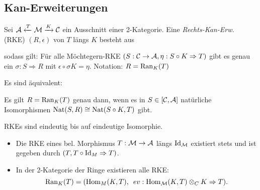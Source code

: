 \documentclass{cheat-sheet}
\begin{document}
\vfill
\columnbreak

\subsection{Kan-Erweiterungen}

\begin{defn}
  Sei $\mathcal{A} \xleftarrow{T} \mathcal{M} \xrightarrow{K} \mathcal{C}$ ein Ausschnitt einer 2-Kategorie. Eine \emph{Rechts-Kan-Erw.} (RKE) $(R, \epsilon)$ von $T$ längs $K$ besteht aus
  \begin{itemize}
  \end{itemize}
  sodass gilt:
  Für alle Möchtegern-RKE $(S : \mathcal{C} \to \mathcal{A}, \eta : S \circ K \Rightarrow T)$ gibt es genau ein $\sigma : S \Rightarrow R$ mit $\epsilon \circ \sigma K = \eta$.
  Notation: $R = \operatorname{Ran}_K(T)$
\end{defn}

\begin{bem}
  Es sind äquivalent: \enspace
   \\
\end{bem}

\begin{bem}
  Es gilt $R = \operatorname{Ran}_K(T)$ genau dann, wenn es in $S \in [\mathcal{C}, \mathcal{A}]$ natürliche Isomorphismen
  $\operatorname{Nat}(S, R) \cong \operatorname{Nat}(S \circ K, T)$ gibt.
\end{bem}

\begin{prop}
  RKEs sind eindeutig bis auf eindeutige Isomorphie.
\end{prop}

\begin{bspe}
  \begin{itemize}
    \item Die RKE eines bel. Morphismus $T : \mathcal{M} \to \mathcal{A}$ längs $\operatorname{Id}_{\mathcal{M}}$ existiert stets und ist gegeben durch $(T, T \circ \operatorname{Id}_M \Rightarrow T)$.
    \item In der 2-Kategorie der Ringe existieren alle RKE:
    \[ \operatorname{Ran}_K(T) = (\operatorname{Hom}_M(K, T), \enspace ev : \operatorname{Hom}_{\mathcal{M}}(K, T) \otimes_C K \Rightarrow T). \]
  \end{itemize}
\end{bspe}
\end{document}
